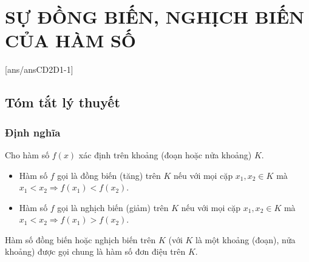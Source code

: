 \notename
{}
\section{SỰ ĐỒNG BIẾN, NGHỊCH BIẾN CỦA HÀM SỐ}
[ans/ansCD2D1-1]
\subsection{Tóm tắt lý thuyết}
\subsubsection{Định nghĩa}
Cho hàm số $f(x)$ xác định trên khoảng (đoạn hoặc nửa khoảng) $K$.
\begin{center}
	\begin{itemize}
	\item Hàm số $f$ gọi là đồng biến (tăng) trên $K$ nếu với mọi cặp $x_1,x_2\in K$ mà $x_1<x_2\Rightarrow f(x_1)<f(x_2)$.
	\item Hàm số $f$ gọi là nghịch biến (giảm) trên $K$ nếu với mọi cặp $x_1,x_2\in K$ mà $x_1<x_2\Rightarrow f(x_1)>f(x_2)$.
	\end{itemize}
\end{center}
\begin{note}
Hàm số đồng biến hoặc nghịch biến trên $K$ (với $K$ là một khoảng (đoạn), nửa khoảng) được gọi chung là hàm số đơn điệu trên $K$.	
\end{note}
